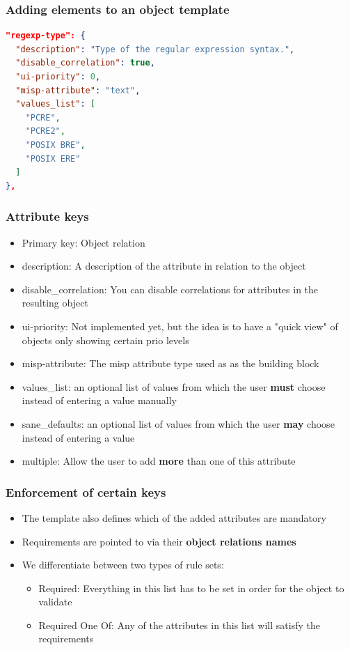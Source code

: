 \begin{frame}[fragile]
\frametitle{Adding elements to an object template}
\begin{lstlisting}[language=json,firstnumber=1]
"regexp-type": {
  "description": "Type of the regular expression syntax.",
  "disable_correlation": true,
  "ui-priority": 0,
  "misp-attribute": "text",
  "values_list": [
    "PCRE",
    "PCRE2",
    "POSIX BRE",
    "POSIX ERE"
  ]
},
\end{lstlisting}
\end{frame}

\begin{frame}
\frametitle{Attribute keys}
\begin{itemize}
\item Primary key: Object relation
\item description: A description of the attribute in relation to the object
\item disable\_correlation: You can disable correlations for attributes in the resulting object
\item ui-priority: Not implemented yet, but the idea is to have a "quick view" of objects only showing certain prio levels
\item misp-attribute: The misp attribute type used as as the building block
\item values\_list: an optional list of values from which the user {\bf must} choose instead of entering a value manually
\item sane\_defaults: an optional list of values from which the user {\bf may} choose instead of entering a value
\item multiple: Allow the user to add {\bf more} than one of this attribute
\end{itemize}
\end{frame}

\begin{frame}
\frametitle{Enforcement of certain keys}
\begin{itemize}
\item The template also defines which of the added attributes are mandatory
\item Requirements are pointed to via their {\bf object relations names}
\item We differentiate between two types of rule sets:
\begin{itemize}
\item Required: Everything in this list has to be set in order for the object to validate
\item Required One Of: Any of the attributes in this list will satisfy the requirements
\end{itemize}
\end{itemize}
\end{frame}

